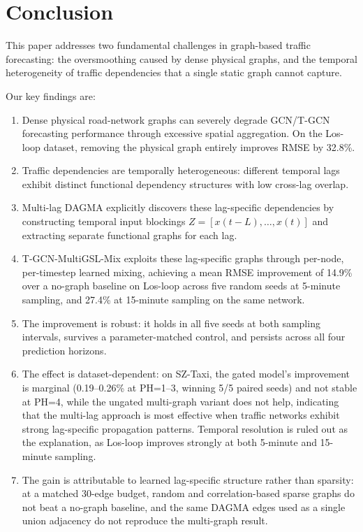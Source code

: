 \section{Conclusion}\label{sec:conclusion}

This paper addresses two fundamental challenges in graph-based traffic forecasting: the oversmoothing caused by dense physical graphs, and the temporal heterogeneity of traffic dependencies that a single static graph cannot capture.

Our key findings are:

\begin{enumerate}
    \item Dense physical road-network graphs can severely degrade GCN/T-GCN forecasting performance through excessive spatial aggregation. On the Los-loop dataset, removing the physical graph entirely improves RMSE by 32.8\%.

    \item Traffic dependencies are temporally heterogeneous: different temporal lags exhibit distinct functional dependency structures with low cross-lag overlap.

    \item Multi-lag DAGMA explicitly discovers these lag-specific dependencies by constructing temporal input blockings $Z = [x(t{-}L), \ldots, x(t)]$ and extracting separate functional graphs for each lag.

    \item T-GCN-MultiGSL-Mix exploits these lag-specific graphs through per-node, per-timestep learned mixing, achieving a mean RMSE improvement of 14.9\% over a no-graph baseline on Los-loop across five random seeds at 5-minute sampling, and 27.4\% at 15-minute sampling on the same network.

    \item The improvement is robust: it holds in all five seeds at both sampling intervals, survives a parameter-matched control, and persists across all four prediction horizons.

    \item The effect is dataset-dependent: on SZ-Taxi, the gated model's improvement is marginal (0.19--0.26\% at PH=1--3, winning 5/5 paired seeds) and not stable at PH=4, while the ungated multi-graph variant does not help, indicating that the multi-lag approach is most effective when traffic networks exhibit strong lag-specific propagation patterns. Temporal resolution is ruled out as the explanation, as Los-loop improves strongly at both 5-minute and 15-minute sampling.

    \item The gain is attributable to learned lag-specific structure rather than sparsity: at a matched 30-edge budget, random and correlation-based sparse graphs do not beat a no-graph baseline, and the same DAGMA edges used as a single union adjacency do not reproduce the multi-graph result.
\end{enumerate}

